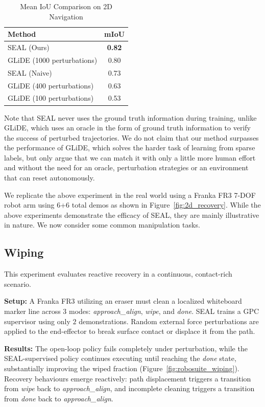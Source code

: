 \documentclass[journal]{IEEEtran}
\begin{document}
\begin{table}[h]
    \centering
    \caption{Mean IoU Comparison on 2D Navigation}
    \label{tab:miou_results}
    \begin{tabular}{lc}
        \toprule
        \textbf{Method} & \textbf{mIoU} \\
        \midrule
        SEAL (Ours) & \textbf{0.82} \\
        GLiDE (1000 perturbations) & 0.80 \\
        SEAL (Naive) & 0.73 \\
        GLiDE (400 perturbations) & 0.63 \\
        GLiDE (100 perturbations) & 0.53 \\
        \bottomrule
    \end{tabular}
\end{table}

Note that SEAL never uses the ground truth information during training, unlike GLiDE, which uses an oracle in the form of ground truth information to verify the success of perturbed trajectories. We do not claim that our method surpasses the performance of GLiDE, which solves the harder task of learning from sparse labels, but only argue that we can match it with only a little more human effort and without the need for an oracle, perturbation strategies or an environment that can reset autonomously.  

We replicate the above experiment in the real world using a Franka FR3 7-DOF robot arm using 6+6 total demos as shown in Figure~\ref{fig:2d_recovery}. 
While the above experiments demonstrate the efficacy of SEAL, they are mainly illustrative in nature. We now consider some common manipulation tasks.


\subsection{Wiping}
This experiment evaluates reactive recovery in a continuous, contact-rich scenario.


\textbf{Setup:} A Franka FR3 utilizing an eraser must clean a localized whiteboard marker line across 3 modes: \textit{approach\_align}, \textit{wipe}, and \textit{done}. SEAL trains a GPC supervisor using only $2$ demonstrations. Random external force perturbations are applied to the end-effector to break surface contact or displace it from the path.

 \textbf{Results:} The open-loop policy fails completely under perturbation, while the SEAL-supervised policy continues executing until reaching the \textit{done} state, substantially improving the wiped fraction (Figure~\ref{fig:robosuite_wiping}). Recovery behaviours emerge reactively: path displacement triggers a transition from \textit{wipe} back to \textit{approach\_align}, and incomplete cleaning triggers a transition from \textit{done} back to \textit{approach\_align}.
\end{document}
